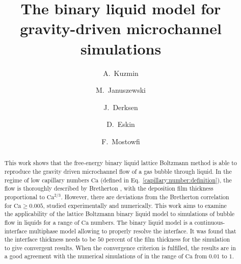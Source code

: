 \documentclass[preprint,12pt]{elsarticle}
\newcommand{\Ca}{\mathrm{Ca}}
\begin{document}
\begin{frontmatter}


\title{The binary liquid model for gravity-driven microchannel simulations}


\author[uofa]{A.~Kuzmin}
\author[us]{M.~Januszewski}
\author[uofa]{J.~Derksen}
\author[schlum]{D.~Eskin}
\author[schlum]{F.~Mostowfi}
\address[us]{Insitute of Physics, University of Silesia, 40-007 Katowice, Poland}
\address[uofa]{Chemical and Materials Engineering, University of Alberta\\ 7th Floor, ECERF, 9107
116 St, Edmonton, Alberta, T6G
2V4 Canada}
\address[schlum]{DBR Schlumberger Technology Center\\ 9450 17 Ave NW, Edmonton, Alberta, T6N 1M9
Canada}

\begin{abstract}
This work shows that the free-energy binary liquid lattice Boltzmann method is able to
reproduce the gravity driven microchannel flow of a gas bubble through liquid. In the regime of low
capillary
numbers
$\Ca$ (defined in Eq.~\ref{capillary:number:definition}), the flow is thoroughly described by
Bretherton \cite{bretherton},
with the deposition film thickness proportional to $\Ca^{2/3}$. However, there are deviations
from the Bretherton correlation for $\Ca\geq 0.005$, studied experimentally and numerically. This
work aims to examine the applicability of the lattice Boltzmann binary liquid model to simulations
of bubble flow in liquids for a range of $\Ca$ numbers. The binary
liquid model is a continuous-interface multiphase model allowing to properly resolve the interface.
It was found that the interface thickness needs to be $50$
percent of the film thickness for the simulation to give convergent results. When
the convergence criterion is fulfilled, the results are in a good agreement with the
numerical simulations of \citet{giavedoni-numerical} in the range of $\Ca$ from $0.01$ to $1$. 
\end{abstract}


\end{frontmatter}
\end{document}
